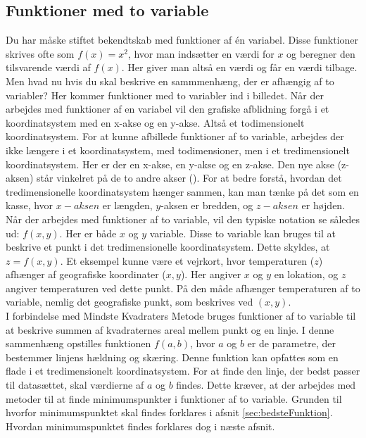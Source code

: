 \subsection{Funktioner med to variable}\label{sec:FunktionerMedToVariable}
Du har måske stiftet bekendtskab med funktioner af én variabel. Disse funktioner skrives ofte som $f(x) = x^2$, hvor man indsætter en værdi for $x$ og beregner den tilsvarende værdi af $f(x)$. Her giver man altså en værdi og får en værdi tilbage. Men hvad nu hvis du skal beskrive en sammmenhæng, der er afhængig af to variabler? Her kommer funktioner med to variabler ind i billedet. Når der arbejdes med funktioner af en variabel vil den grafiske afblidning forgå i et koordinatsystem med en x-akse og en y-akse. Altså et todimensionelt koordinatsystem. For at kunne afbillede funktioner af to variable, arbejdes der ikke længere i et koordinatsystem, med todimensioner, men i et tredimensionelt koordinatsystem. Her er der en x-akse, en y-akse og en z-akse. Den nye akse (z-aksen) står vinkelret på de to andre akser (\cite[246-248]{funktionrAfToVariable}). For at bedre forstå, hvordan det tredimensionelle koordinatsystem hænger sammen, kan man tænke på det som en kasse, hvor  $x-aksen$ er længden, $y$-aksen er bredden, og $z-aksen$ er højden. Når der arbejdes med funktioner af to variable, vil den typiske notation se således ud: $f(x,y)$. Her er både $x$ og $y$ variable. Disse to variable kan bruges til at beskrive et punkt i det tredimensionelle koordinatsystem. Dette skyldes, at $z = f(x,y)$. Et eksempel kunne være et vejrkort, hvor temperaturen ($z$) afhænger af geografiske koordinater ($x, y$). Her angiver $x$ og $y$ en lokation, og $z$ angiver temperaturen ved dette punkt. På den måde afhænger temperaturen af to variable, nemlig det geografiske punkt, som beskrives ved $(x, y)$. \\
I forbindelse med Mindste Kvadraters Metode bruges funktioner af to variable til at beskrive summen af kvadraternes areal mellem punkt og en linje. I denne sammenhæng opstilles funktionen $f(a, b)$, hvor $a$ og $b$ er de parametre, der bestemmer linjens hældning og skæring. Denne funktion kan opfattes som en flade i et tredimensionelt koordinatsystem. 
For at finde den linje, der bedst passer til datasættet, skal værdierne af $a$ og $b$ findes. Dette kræver, at der arbejdes med metoder til at finde minimumspunkter i funktioner af to variable. Grunden til hvorfor minimumspunktet skal findes forklares i afsnit \ref{sec:bedsteFunktion}. Hvordan minimumspunktet findes forklares dog i næste afsnit.

